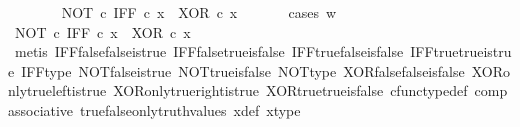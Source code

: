 \begin{isabellebody}
\ \ \ \ \ \ \isamarkupfalse%
\ {\isachardoublequoteopen}{\isacharparenleft}{\kern0pt}NOT\ {\isasymcirc}\isactrlsub c\ IFF{\isacharparenright}{\kern0pt}\ {\isasymcirc}\isactrlsub c\ x\ {\isacharequal}{\kern0pt}\ XOR\ {\isasymcirc}\isactrlsub c\ x{\isachardoublequoteclose}\isanewline
\ \ \ \ \ \ \isamarkupfalse%
{\isacharparenleft}{\kern0pt}cases\ {\isachardoublequoteopen}w\ {\isacharequal}{\kern0pt}\ {\isasymt}{\isachardoublequoteclose}{\isacharparenright}{\kern0pt}\isanewline
\ \ \ \ \ \ \ \ \isamarkupfalse%
\ {\isachardoublequoteopen}{\isacharparenleft}{\kern0pt}NOT\ {\isasymcirc}\isactrlsub c\ IFF{\isacharparenright}{\kern0pt}\ {\isasymcirc}\isactrlsub c\ x\ {\isacharequal}{\kern0pt}\ XOR\ {\isasymcirc}\isactrlsub c\ x{\isachardoublequoteclose}\isanewline
\ \ \ \ \ \ \ \ \ \ \isamarkupfalse%
\ {\isacharparenleft}{\kern0pt}metis\ IFF{\isacharunderscore}{\kern0pt}false{\isacharunderscore}{\kern0pt}false{\isacharunderscore}{\kern0pt}is{\isacharunderscore}{\kern0pt}true\ IFF{\isacharunderscore}{\kern0pt}false{\isacharunderscore}{\kern0pt}true{\isacharunderscore}{\kern0pt}is{\isacharunderscore}{\kern0pt}false\ IFF{\isacharunderscore}{\kern0pt}true{\isacharunderscore}{\kern0pt}false{\isacharunderscore}{\kern0pt}is{\isacharunderscore}{\kern0pt}false\ IFF{\isacharunderscore}{\kern0pt}true{\isacharunderscore}{\kern0pt}true{\isacharunderscore}{\kern0pt}is{\isacharunderscore}{\kern0pt}true\ IFF{\isacharunderscore}{\kern0pt}type\ NOT{\isacharunderscore}{\kern0pt}false{\isacharunderscore}{\kern0pt}is{\isacharunderscore}{\kern0pt}true\ NOT{\isacharunderscore}{\kern0pt}true{\isacharunderscore}{\kern0pt}is{\isacharunderscore}{\kern0pt}false\ NOT{\isacharunderscore}{\kern0pt}type\ XOR{\isacharunderscore}{\kern0pt}false{\isacharunderscore}{\kern0pt}false{\isacharunderscore}{\kern0pt}is{\isacharunderscore}{\kern0pt}false\ XOR{\isacharunderscore}{\kern0pt}only{\isacharunderscore}{\kern0pt}true{\isacharunderscore}{\kern0pt}left{\isacharunderscore}{\kern0pt}is{\isacharunderscore}{\kern0pt}true\ XOR{\isacharunderscore}{\kern0pt}only{\isacharunderscore}{\kern0pt}true{\isacharunderscore}{\kern0pt}right{\isacharunderscore}{\kern0pt}is{\isacharunderscore}{\kern0pt}true\ XOR{\isacharunderscore}{\kern0pt}true{\isacharunderscore}{\kern0pt}true{\isacharunderscore}{\kern0pt}is{\isacharunderscore}{\kern0pt}false\ cfunc{\isacharunderscore}{\kern0pt}type{\isacharunderscore}{\kern0pt}def\ comp{\isacharunderscore}{\kern0pt}associative\ true{\isacharunderscore}{\kern0pt}false{\isacharunderscore}{\kern0pt}only{\isacharunderscore}{\kern0pt}truth{\isacharunderscore}{\kern0pt}values\ x{\isacharunderscore}{\kern0pt}def\ x{\isacharunderscore}{\kern0pt}type{\isacharparenright}{\kern0pt}\isanewline

\end{isabellebody}
